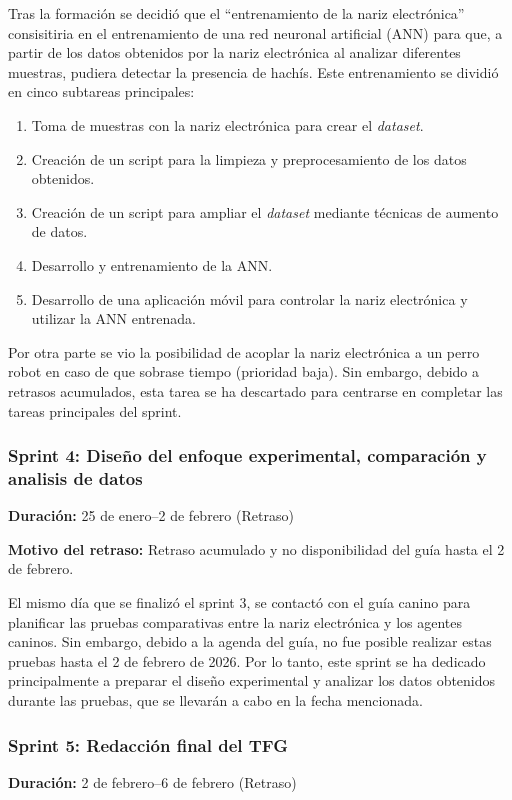 Tras la formación se decidió que el ``entrenamiento de la nariz electrónica'' consisitiria en el entrenamiento de una red neuronal artificial (ANN) para que, a partir de los datos obtenidos por la nariz electrónica al analizar diferentes muestras, pudiera detectar la presencia de hachís. Este entrenamiento se dividió en cinco subtareas principales:
\begin{enumerate}
    \item Toma de muestras con la nariz electrónica para crear el \textit{dataset}.
    \item Creación de un script para la limpieza y preprocesamiento de los datos obtenidos.
    \item Creación de un script para ampliar el \textit{dataset} mediante técnicas de aumento de datos.
    \item Desarrollo y entrenamiento de la ANN\@.
    \item Desarrollo de una aplicación móvil para controlar la nariz electrónica y utilizar la ANN entrenada.
\end{enumerate}

Por otra parte se vio la posibilidad de acoplar la nariz electrónica a un perro robot en caso de que sobrase tiempo (prioridad baja). Sin embargo, debido a retrasos acumulados, esta tarea se ha descartado para centrarse en completar las tareas principales del sprint.
\par

\subsubsection{Sprint 4: Diseño del enfoque experimental, comparación y analisis de datos}
\textbf{Duración:} 25 de enero--2 de febrero (Retraso)

\textbf{Motivo del retraso:} Retraso acumulado y no disponibilidad del guía hasta el 2 de febrero.
\par

El mismo día que se finalizó el sprint 3, se contactó con el guía canino para planificar las pruebas comparativas entre la nariz electrónica y los agentes caninos. Sin embargo, debido a la agenda del guía, no fue posible realizar estas pruebas hasta el 2 de febrero de 2026. Por lo tanto, este sprint se ha dedicado principalmente a preparar el diseño experimental y analizar los datos obtenidos durante las pruebas, que se llevarán a cabo en la fecha mencionada.
\par

\subsubsection{Sprint 5: Redacción final del TFG}
\textbf{Duración:} 2 de febrero--6 de febrero (Retraso)

